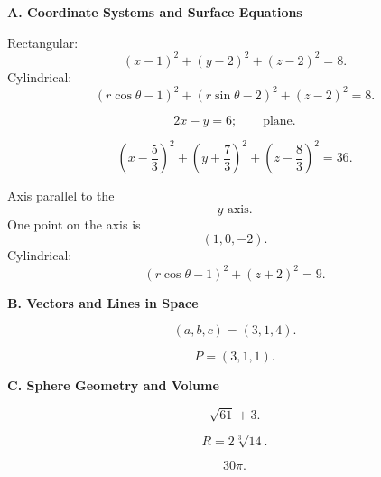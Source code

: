 \documentclass[10pt]{article}
\newcommand{\answerbar}[1]{%
  \vspace{0.55em}%
  \noindent\colorbox{sectiongray}{%
    \parbox{\dimexpr\textwidth-2\fboxsep\relax}{%
      \strut\textbf{#1}\strut
    }%
  }%
  \par\vspace{0.50em}%
}
\begin{document}
\vspace{0.30em}

\answerbar{A. Coordinate Systems and Surface Equations}

\begin{answers}[label=\textbf{A\arabic*.},itemsep=0.95em]

\item
Rectangular:
\[
\boxed{(x-1)^2+(y-2)^2+(z-2)^2=8}.
\]
Cylindrical:
\[
\boxed{(r\cos\theta-1)^2+(r\sin\theta-2)^2+(z-2)^2=8}.
\]

\item
\[
\boxed{2x-y=6};
\qquad
\boxed{\text{plane}}.
\]

\item
\[
\boxed{
\left(x-\frac53\right)^2
+
\left(y+\frac73\right)^2
+
\left(z-\frac83\right)^2
=36
}.
\]

\item
Axis parallel to the
\[
\boxed{y\text{-axis}}.
\]
One point on the axis is
\[
\boxed{(1,0,-2)}.
\]
Cylindrical:
\[
\boxed{(r\cos\theta-1)^2+(z+2)^2=9}.
\]

\end{answers}

\vspace{0.30em}

\answerbar{B. Vectors and Lines in Space}

\begin{answers}[label=\textbf{B\arabic*.},itemsep=1.00em]

\item
\[
\boxed{(a,b,c)=(3,1,4)}.
\]

\item
\[
\boxed{P=(3,1,1)}.
\]

\end{answers}

\vspace{0.30em}

\answerbar{C. Sphere Geometry and Volume}

\begin{answers}[label=\textbf{C\arabic*.},itemsep=1.00em]

\item
\[
\boxed{\sqrt{61}+3}.
\]

\item
\[
\boxed{R=2\sqrt[3]{14}}.
\]

\item
\[
\boxed{30\pi}.
\]

\end{answers}
\end{document}
